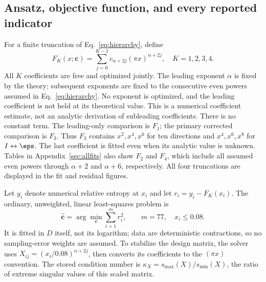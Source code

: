 \subsection{Ansatz, objective function, and every reported indicator}
For a finite truncation of Eq.~\eqref{eq:hierarchy}, define
\begin{equation}
 F_K(x;\bm c)=\sum_{j=0}^{K-1}c_{\alpha+2j}(\pi x)^{\alpha+2j},
 \quad K=1,2,3,4.
 \label{eq:fit}
\end{equation}
All $K$ coefficients are free and optimized jointly. The leading exponent
$\alpha$ is fixed by the theory; subsequent exponents are fixed to the
consecutive even powers assumed in Eq.~\eqref{eq:hierarchy}.
No exponent is optimized, and the leading coefficient is not held at its
theoretical value. This is a numerical coefficient estimate, not an
analytic derivation of subleading coefficients.
There is no constant term. The leading-only comparison is $F_1$; the
primary corrected comparison is $F_3$. Thus $F_3$ contains $x^2,x^4,x^6$
for ten directions and $x^4,x^6,x^8$ for $I\leftrightarrow\eps$.
The last coefficient is fitted even when its analytic value is unknown.
Tables in Appendix~\ref{sec:allfits} also show $F_2$ and $F_4$, which
include all assumed even powers through $\alpha+2$ and $\alpha+6$, respectively.
All four truncations are displayed in the fit and residual figures.

Let $y_i$ denote numerical relative entropy at $x_i$ and let
$r_i=y_i-F_K(x_i)$. The ordinary, unweighted, linear least-squares
problem is
\begin{equation}
 \widehat{\bm c}=\arg\min_{\bm c}\sum_{i=1}^{m}r_i^2,\qquad m=77,
 \quad x_i\leq0.08.
 \label{eq:objective}
\end{equation}
It is fitted in $D$ itself, not its logarithm; data are deterministic
contractions, so no sampling-error weights are assumed. To stabilize the
design matrix, the solver uses $X_{ij}=(x_i/0.08)^{\alpha+2j}$,
then converts its coefficients to the $(\pi x)$ convention.
The stored condition number is $\kappa_X=s_{\max}(X)/s_{\min}(X)$, the
ratio of extreme singular values of this scaled matrix.

